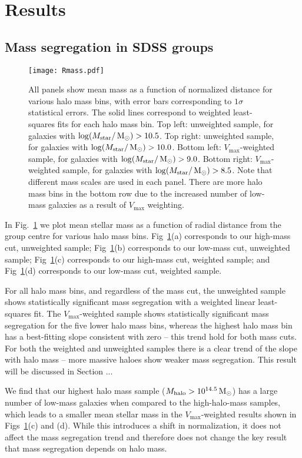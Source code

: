 \section{Results}
\label{sec:results_ms}

\subsection{Mass segregation in SDSS groups}

\begin{figure}[!ht]
  \centering
  \texttt{[image: Rmass.pdf]}
  \caption[Mean mass versus group-centric radius for various halo mass
    bins]{All panels show mean mass as a function of normalized
    distance for various halo mass bins, with error bars corresponding
  to $1\sigma$ statistical errors.  The solid lines correspond to
  weighted least-squares fits for each halo mass bin.  Top left:
  unweighted sample, for galaxies with $\log(M_\mathrm{star}/\,\mathrm{M_{\odot}}) >
  10.5$.  Top right: unweighted sample, for galaxies with
  $\log(M_\mathrm{star}/\,\mathrm{M_{\odot}}) > 10.0$.  Bottom left:
  $V_\mathrm{max}$-weighted sample, for galaxies with
  $\log(M_\mathrm{star}/\,\mathrm{M_{\odot}}) > 9.0$.  Bottom right:
  $V_\mathrm{max}$-weighted sample, for galaxies with
  $\log(M_\mathrm{star}/\,\mathrm{M_{\odot}}) > 8.5$.  Note that different mass
  scales are used in each panel.  There are more halo mass bins in the
  bottom row due to the increased number of low-mass galaxies as a
  result of $V_\mathrm{max}$ weighting.}
  \label{fig:Rmass}
\end{figure}

In Fig.~\ref{fig:Rmass} we plot mean stellar mass as a function of
radial distance from the group centre for various halo mass bins.
Fig~\ref{fig:Rmass}(a) corresponds to our high-mass cut, unweighted
sample; Fig~\ref{fig:Rmass}(b) corresponds to our low-mass cut,
unweighted sample; Fig~\ref{fig:Rmass}(c) corresponds to our high-mass
cut, weighted sample; and Fig~\ref{fig:Rmass}(d) corresponds to our
low-mass cut, weighted sample.
\par
For all halo mass bins, and regardless of the mass cut, the unweighted
sample shows statistically significant mass segregation with a
weighted linear least-squares fit.  The $V_\mathrm{max}$-weighted
sample shows statistically significant mass segregation for the five
lower halo mass bins, whereas the highest halo mass bin has a
best-fitting slope consistent with zero -- this trend hold for both
mass cuts.  For both the weighted and unweighted samples there is a
clear trend of the slope with halo mass -- more massive haloes show
weaker mass segregation.  This result will be discussed in Section ...
\par
We find that our highest halo mass sample ($M_\mathrm{halo} >
10^{14.5}\,\mathrm{M_{\odot}}$) has a large number of low-mass galaxies when compared
to the high-halo-mass samples, which leads to a smaller mean stellar
mass in the $V_\mathrm{max}$-weighted results shown in
Figs~\ref{fig:Rmass}(c) and (d).  While this introduces a shift in
normalization, it does not affect the mass segregation trend and
therefore does not change the key result that mass segregation depends
on halo mass.

